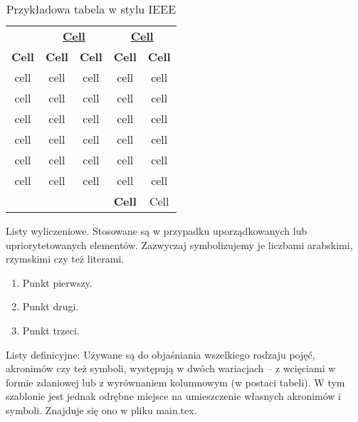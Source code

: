 \begin{table}[H] \centering
    \caption{Przykładowa tabela w stylu IEEE}
    \label{tab:IEEE}
    \begin{tabular}{c c c c c}
        \toprule[2pt]
         & \multicolumn{2}{c}{\textbf{\uline{Cell}}}& \multicolumn{2}{c}{\textbf{\uline{Cell}}}   \\
        \textbf{{Cell}}  &\textbf{{Cell}}     &  \textbf{Cell}&   \textbf{Cell} &  \textbf{Cell} \\  \midrule
        cell  & cell & cell & cell & cell   \\
        cell  & cell & cell & cell & cell   \\
        cell  & cell & cell & cell & cell   \\
        cell  & cell & cell & cell & cell   \\
        cell  & cell & cell & cell & cell   \\ 
        cell  & cell & cell & cell & cell   \\ \midrule
        \multicolumn{4}{r}{\textbf{Cell}} & Cell \\
        \bottomrule[2pt]
    \end{tabular}
\end{table}

\noindent Listy wyliczeniowe. Stosowane są w przypadku uporządkowanych lub upriorytetowanych elementów. Zazwyczaj symbolizujemy je liczbami arabskimi, rzymskimi czy też literami.
\begin{enumerate}
    \item Punkt pierwszy.
    \item Punkt drugi.
    \item Punkt trzeci.
\end{enumerate}
\noindent Listy definicyjne:
Używane są do objaśniania wszelkiego rodzaju pojęć,  akronimów czy też symboli, występują w dwóch
wariacjach -- z wcięciami w formie zdaniowej lub z wyrównaniem kolumnowym (w postaci tabeli).
W tym szablonie jest jednak odrębne miejsce na umieszczenie własnych akronimów i symboli. Znajduje
się ono w pliku main.tex.


